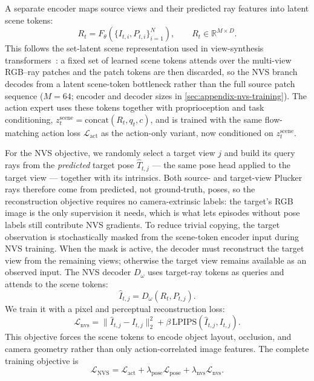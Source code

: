 A separate encoder maps source views and their predicted ray features into latent scene tokens:
\begin{equation}
R_t = F_\theta\left(\{I_{t,i},P_{t,i}\}_{i=1}^{N}\right),
\qquad R_t\in\mathbb{R}^{M\times D}.
\end{equation}
This follows the set-latent scene representation used in view-synthesis
transformers~\citep{sajjadi2022srt,jin2024lvsm,jiang2025rayzer}: a fixed set of
learned scene tokens attends over the multi-view RGB--ray patches and the patch
tokens are then discarded, so the NVS branch decodes from a latent scene-token
bottleneck rather than the full source patch sequence (\(M{=}64\); encoder and
decoder sizes in \autoref{sec:appendix-nvs-training}).  The action expert uses
these tokens together with proprioception and task conditioning,
\(z_t^{\text{scene}} = \text{concat}(R_t, q_t, c)\), and is trained with the same
flow-matching action loss \(\mathcal{L}_{\text{act}}\) as the action-only
variant, now conditioned on \(z_t^{\text{scene}}\).

For the NVS objective, we randomly select a target view \(j\) and build its
query rays from the \emph{predicted} target pose \(\hat{T}_{t,j}\) --- the same
pose head applied to the target view --- together with its intrinsics.  Both
source- and target-view Plucker rays therefore come from predicted, not
ground-truth, poses, so the reconstruction objective requires no
camera-extrinsic labels: the target's RGB image is the only supervision it
needs, which is what lets episodes without pose labels still contribute NVS
gradients.
To reduce trivial copying, the target observation is stochastically masked from
the scene-token encoder input during NVS training.  When the mask is active, the
decoder must reconstruct the target view from the remaining views; otherwise the
target view remains available as an observed input.  The NVS decoder \(D_\omega\)
uses target-ray tokens as queries and attends to the scene tokens:
\begin{equation}
\hat{I}_{t,j} =
D_\omega\left(R_t, P_{t,j}\right).
\end{equation}
We train it with a pixel and perceptual reconstruction loss:
\begin{equation}
\mathcal{L}_{\text{nvs}} =
\|\hat{I}_{t,j}-I_{t,j}\|_2^2
+\beta\,\text{LPIPS}(\hat{I}_{t,j}, I_{t,j}).
\end{equation}
This objective forces the scene tokens to encode object layout, occlusion, and
camera geometry rather than only action-correlated image features.  The complete
training objective is
\begin{equation}
\mathcal{L}_{\text{NVS}} =
\mathcal{L}_{\text{act}}
+\lambda_{\text{pose}}\mathcal{L}_{\text{pose}}
+\lambda_{\text{nvs}}\mathcal{L}_{\text{nvs}}.
\end{equation}

